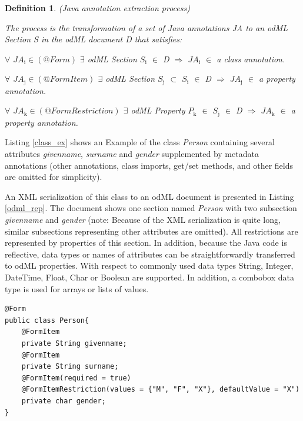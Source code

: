\documentclass[a4paper,twoside]{article}
\newtheorem{definition}{Definition}
\begin{document}
\begin{definition}
\label{def:Java_annotation_extraction_process}
(Java annotation extraction process)

\emph{The process is the transformation of a set of Java annotations JA to an odML Section S in the odML document D that satisfies:}

\emph{$\forall$ $JA{}_{\text{i}}\in {(@Form)}$ $\exists$ odML Section $S{}_{\text{i}}$ $\in$ D $\Rightarrow$ $JA{}_{\text{i}}$ $\in$ a class annotation}.

\emph{$\forall$ $JA{}_{\text{j}}\in {(@FormItem)}$ $\exists$ odML Section $S{}_{\text{j}}$ $\subset$ $S{}_{\text{i}}$ $\in$ D $\Rightarrow$ $JA{}_{\text{j}}$ $\in$ a property
annotation}.

\emph{$\forall$ $JA{}_{\text{k}}\in {(@FormRestriction)}$ $\exists$ odML Property $P{}_{\text{k}}$ $\in$ $S{}_{\text{j}}$ $\in$ D $\Rightarrow$ $JA{}_{\text{k}}$ $\in$ a property  annotation}.

\end{definition}


Listing \ref{class_ex} shows an Example of the class \textit{Person} containing several attributes \textit{givenname}, \textit{surname} and \textit{gender} supplemented by metadata annotations (other annotations, class imports, get/set methods, and other fields are omitted for simplicity).

An XML serialization of this class to an odML document is presented in Listing \ref{odml_rep}. The document shows one section named \textit{Person} with two subsection \textit{givenname} and \textit{gender} (note: Because of the XML serialization is quite long, similar subsections representing other attributes are omitted). All restrictions are represented by properties of this section. In addition, because the Java code is reflective, data types or names of attributes can be straightforwardly transferred to odML properties. With respect to commonly used data types String, Integer, DateTime, Float, Char or Boolean are supported. In addition, a combobox data type is used for arrays or lists of values.


\scriptsize
\begin{lstlisting}[label=class_ex,caption=Java Class Example]
@Form
public class Person{
	@FormItem
	private String givenname;
	@FormItem
	private String surname;
	@FormItem(required = true)
	@FormItemRestriction(values = {"M", "F", "X"}, defaultValue = "X")
	private char gender;
}
\end{lstlisting}
\normalsize
\end{document}
